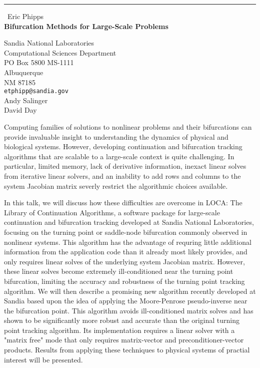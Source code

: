 \documentclass{report}
\begin{document}
\begin{center}
\rule{6in}{1pt} \
{\large Eric Phipps \\
{\bf Bifurcation Methods for Large-Scale Problems}}

Sandia National Laboratories \\ Computational Sciences Department \\ PO Box 5800 MS-1111 \\ Albuquerque \\ NM  87185
\\
{\tt etphipp@sandia.gov}\\
Andy Salinger\\
David Day\end{center}

Computing families of solutions to nonlinear problems and their
bifurcations can provide invaluable insight to understanding the dynamics
of physical and biological systems. However, developing continuation and
bifurcation tracking algorithms that are scalable to a large-scale
context is quite challenging. In particular, limited memory, lack of
derivative information, inexact linear
solves from iterative linear solvers, and an inability to add rows and
columns to the system Jacobian matrix severly restrict the algorithmic
choices available.

In this talk, we will discuss how these difficulties are overcome in
LOCA: The Library of Continuation Algorithms, a software package for
large-scale continuation and bifurcation tracking developed at Sandia
National Laboratories, focusing on the turning point or saddle-node
bifurcation commonly observed in nonlinear systems. This algorithm has
the advantage of requring little additional information from the
application code than it
already most likely provides, and only requires linear solves of the
underlying system Jacobian matrix. However, these linear solves become
extremely ill-conditioned near the turning point bifurcation, limiting
the accuracy and robustness of the turning point tracking algorithm. We
will then describe a promising new algorithm recently developed at Sandia
based upon the idea of
applying the Moore-Penrose pseudo-inverse near the bifurcation point.
This algorithm avoids ill-conditioned matrix solves and has shown to be
significantly more robust and accurate than the original turning point
tracking algorithm. Its implementation requires a linear solver with a
"matrix free" mode that only requires matrix-vector and
preconditioner-vector products. Results from applying these techniques to
physical systems of practial interest will be presented.
\end{document}
